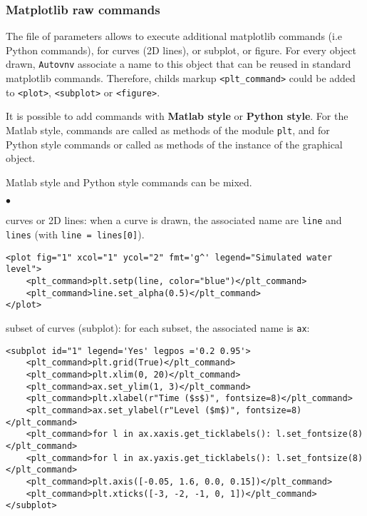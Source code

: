 \documentclass[a4paper,10pt,twoside]{csshortdoc}
\begin{document}
\subsubsection{Matplotlib raw commands}\label{sec:raw}

The file of parameters allows to execute additional matplotlib commands (i.e
Python commands), for curves (2D lines), or subplot, or figure. For every object
drawn, \texttt{Autovnv} associate a name to this object that can be reused in
standard matplotlib commands. Therefore, childs markup \texttt{<plt\_command>}
could be added to \texttt{<plot>}, \texttt{<subplot>} or \texttt{<figure>}.

It is possible to add commands with \textbf{Matlab style} or \textbf{Python
style}. For the Matlab style, commands are called as methods of the module
\texttt{plt}, and for Python style commands or called as methods of the instance
of the graphical object.

Matlab style and Python style commands can be mixed.

\begin{list}{$\bullet$}{}

\item curves or 2D lines: when a curve is drawn, the associated name
are \texttt{line} and \texttt{lines} (with \texttt{line = lines[0]}).

\small
\begin{verbatim}
<plot fig="1" xcol="1" ycol="2" fmt='g^' legend="Simulated water level">
    <plt_command>plt.setp(line, color="blue")</plt_command>
    <plt_command>line.set_alpha(0.5)</plt_command>
</plot>
\end{verbatim}
\normalsize

\item subset of curves (subplot): for each subset, the associated name is \texttt{ax}:

\small
\begin{verbatim}
<subplot id="1" legend='Yes' legpos ='0.2 0.95'>
    <plt_command>plt.grid(True)</plt_command>
    <plt_command>plt.xlim(0, 20)</plt_command>
    <plt_command>ax.set_ylim(1, 3)</plt_command>
    <plt_command>plt.xlabel(r"Time ($s$)", fontsize=8)</plt_command>
    <plt_command>ax.set_ylabel(r"Level ($m$)", fontsize=8)</plt_command>
    <plt_command>for l in ax.xaxis.get_ticklabels(): l.set_fontsize(8)</plt_command>
    <plt_command>for l in ax.yaxis.get_ticklabels(): l.set_fontsize(8)</plt_command>
    <plt_command>plt.axis([-0.05, 1.6, 0.0, 0.15])</plt_command>
    <plt_command>plt.xticks([-3, -2, -1, 0, 1])</plt_command>
</subplot>
\end{verbatim}
\normalsize


\end{list}
\end{document}
